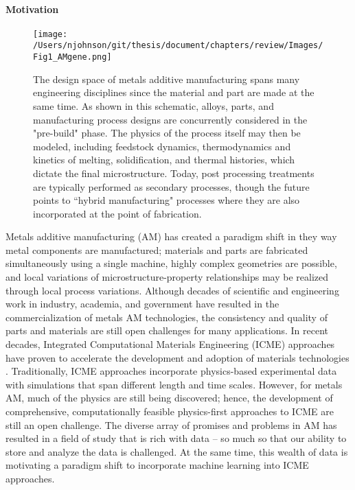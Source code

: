 \vspace{-2em}
\paragraph{Motivation}
\begin{figure*}[t]
	\texttt{[image: /Users/njohnson/git/thesis/document/chapters/review/Images/Fig1\_AMgene.png]}
	\caption{The design space of metals additive manufacturing spans many engineering disciplines since the material and part are made at the same time. As shown in this schematic, alloys, parts, and manufacturing process designs are concurrently considered in the "pre-build" phase. The physics of the process itself may then be modeled, including feedstock dynamics, thermodynamics and kinetics of melting, solidification, and thermal histories, which dictate the final microstructure. Today, post processing treatments are typically performed as secondary processes, though the future points to ``hybrid manufacturing" processes where they are also incorporated at the point of fabrication.}
	\label{AMgene}
\end{figure*}

Metals additive manufacturing (AM) has created a paradigm shift in they way metal components are manufactured; materials and parts are fabricated simultaneously using a single machine, highly complex geometries are possible, and local variations of microstructure-property relationships may be realized through local process variations. Although decades of scientific and engineering work in industry, academia, and government have resulted in the commercialization of metals AM technologies, the consistency and quality of parts and materials are still open challenges for many applications. In recent decades, Integrated Computational Materials Engineering (ICME) approaches have proven to accelerate the development and adoption of materials technologies \cite{Panchal2013}. Traditionally, ICME approaches incorporate physics-based experimental data with simulations that span different length and time scales. However, for metals AM, much of the physics are still being discovered; hence, the development of comprehensive, computationally feasible physics-first approaches to ICME are still an open challenge. The diverse array of promises and problems in AM has resulted in a field of study that is rich with data -- so much so that our ability to store and analyze the data is challenged. At the same time, this wealth of data is motivating a paradigm shift to incorporate machine learning into ICME approaches. 

